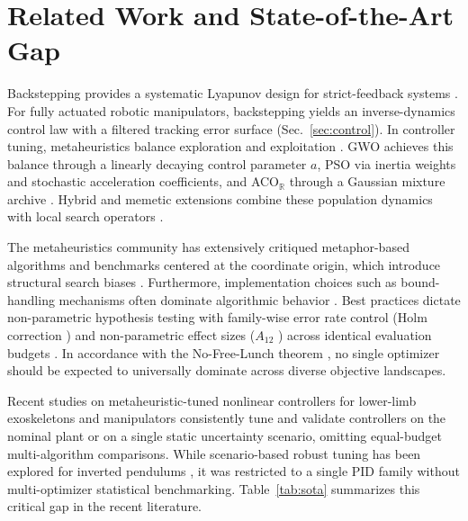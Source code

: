 \documentclass[a4paper,fleqn]{cas-dc}
\newcommand{\acor}{ACO$_\mathbb{R}$}
\begin{document}
\section{Related Work and State-of-the-Art Gap}
Backstepping provides a systematic Lyapunov design for strict-feedback systems \cite{krstic1995,khalil2002}. For fully actuated robotic manipulators, backstepping yields an inverse-dynamics control law with a filtered tracking error surface (Sec.~\ref{sec:control}). In controller tuning, metaheuristics balance exploration and exploitation \cite{crepinsek2013}. GWO achieves this balance through a linearly decaying control parameter $a$, PSO via inertia weights and stochastic acceleration coefficients, and \acor{} through a Gaussian mixture archive \cite{mirjalili2014,clerc2002,socha2008}. Hybrid and memetic extensions combine these population dynamics with local search operators \cite{neri2012,blum2003}.

The metaheuristics community has extensively critiqued metaphor-based algorithms \cite{sorensen2015,camacho2023} and benchmarks centered at the coordinate origin, which introduce structural search biases \cite{kononova2014,kudela2022}. Furthermore, implementation choices such as bound-handling mechanisms often dominate algorithmic behavior \cite{helwig2013}. Best practices dictate non-parametric hypothesis testing with family-wise error rate control (Holm correction \cite{holm1979}) and non-parametric effect sizes ($A_{12}$ \cite{vargha2000}) across identical evaluation budgets \cite{derrac2011}. In accordance with the No-Free-Lunch theorem \cite{wolpert1997}, no single optimizer should be expected to universally dominate across diverse objective landscapes.

Recent studies on metaheuristic-tuned nonlinear controllers for lower-limb exoskeletons \cite{faraj2023,zheng2026} and manipulators \cite{rezoug2022,azeez2023,dai2023} consistently tune and validate controllers on the nominal plant or on a single static uncertainty scenario, omitting equal-budget multi-algorithm comparisons. While scenario-based robust tuning has been explored for inverted pendulums \cite{zorlu2026}, it was restricted to a single PID family without multi-optimizer statistical benchmarking. Table~\ref{tab:sota} summarizes this critical gap in the recent literature.
\end{document}
